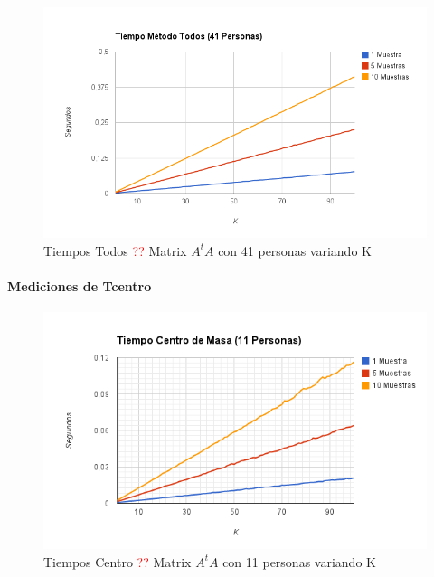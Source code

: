 \begin{figure}[H]
\includegraphics[width=1\textwidth]{img/image6.png}
     \caption{Tiempos Todos \textcolor{red}{??} Matrix $A^tA$ con 41 personas variando K}
     \label{fig:figura1}
\end{figure}


\paragraph{Mediciones de Tcentro }

\begin{figure}[H]
\includegraphics[width=1\textwidth]{img/image7.png}
     \caption{Tiempos Centro \textcolor{red}{??} Matrix $A^tA$ con 11 personas variando K}
     \label{fig:figura1}
\end{figure}

